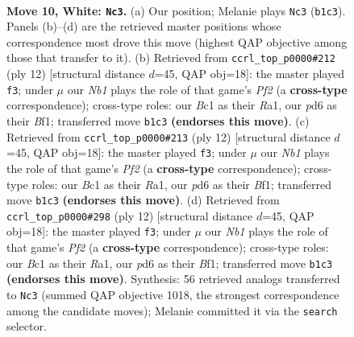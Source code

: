 \documentclass[11pt]{article}
\begin{document}
\clearpage

\begin{figure}[p]\centering
\begin{subfigure}{0.46\textwidth}\centering
\resizebox{\linewidth}{!}{%
\newchessgame
\chessboard[
  setfen={rnbqk2r/ppp3b1/1n1p2p1/5p1p/3P4/1B3N2/PPP1KPPP/RNBQ2R1 w kq - 0 10},
  showmover=false,
  pgfstyle=straightmove, color=movearrow, markmove={b1-c3}
]}
\caption{}
\end{subfigure}\hfill
\begin{subfigure}{0.46\textwidth}\centering
\resizebox{\linewidth}{!}{%
\newchessgame
\chessboard[
  setfen={rnbqk2r/pp2ppbp/3p1np1/8/3NP3/2N1B3/PPP2PPP/R2QKB1R w KQkq - 2 7},
  showmover=false,
  pgfstyle=straightmove, color=movearrow, markmove={f2-f3}
]}
\caption{}
\end{subfigure}
\\[4pt]
\begin{subfigure}{0.46\textwidth}\centering
\resizebox{\linewidth}{!}{%
\newchessgame
\chessboard[
  setfen={rnbqk2r/pp2ppbp/3p1np1/8/3NP3/2N1B3/PPP2PPP/R2QKB1R w KQkq - 2 7},
  showmover=false,
  pgfstyle=straightmove, color=movearrow, markmove={f2-f3}
]}
\caption{}
\end{subfigure}\hfill
\begin{subfigure}{0.46\textwidth}\centering
\resizebox{\linewidth}{!}{%
\newchessgame
\chessboard[
  setfen={rnbqk2r/pp2ppbp/3p1np1/8/3NP3/2N1B3/PPP2PPP/R2QKB1R w KQkq - 2 7},
  showmover=false,
  pgfstyle=straightmove, color=movearrow, markmove={f2-f3}
]}
\caption{}
\end{subfigure}
\caption{\textbf{Move 10, White: \texttt{Nc3}.} (a) Our position; Melanie plays \texttt{Nc3} (\texttt{b1c3}). Panels (b)--(d) are the retrieved master positions whose correspondence most drove this move (highest QAP objective among those that transfer to it). (b) Retrieved from \texttt{ccrl\_top\_p0000\#212} (ply 12) [structural distance $d$=45, QAP obj=18]: the master played \texttt{f3}; under $\mu$ our \emph{Nb1} plays the role of that game's \emph{Pf2} (a \textbf{cross-type} correspondence); cross-type roles: our \emph{B}c1 as their \emph{R}a1, our \emph{p}d6 as their \emph{B}f1; transferred move \texttt{b1c3} \textbf{(endorses this move)}. (c) Retrieved from \texttt{ccrl\_top\_p0000\#213} (ply 12) [structural distance $d$=45, QAP obj=18]: the master played \texttt{f3}; under $\mu$ our \emph{Nb1} plays the role of that game's \emph{Pf2} (a \textbf{cross-type} correspondence); cross-type roles: our \emph{B}c1 as their \emph{R}a1, our \emph{p}d6 as their \emph{B}f1; transferred move \texttt{b1c3} \textbf{(endorses this move)}. (d) Retrieved from \texttt{ccrl\_top\_p0000\#298} (ply 12) [structural distance $d$=45, QAP obj=18]: the master played \texttt{f3}; under $\mu$ our \emph{Nb1} plays the role of that game's \emph{Pf2} (a \textbf{cross-type} correspondence); cross-type roles: our \emph{B}c1 as their \emph{R}a1, our \emph{p}d6 as their \emph{B}f1; transferred move \texttt{b1c3} \textbf{(endorses this move)}. Synthesis: 56 retrieved analogs transferred to \texttt{Nc3} (summed QAP objective 1018, the strongest correspondence among the candidate moves); Melanie committed it via the \texttt{search} selector.}
\label{fig:thought-m18}
\end{figure}
\end{document}

